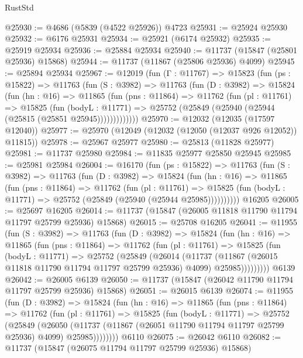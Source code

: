 \begin{lexlean}{RustStd}
\begin{coremodule}
@25930 := @4686 (@5839 (@4522 @25926)) @4723
@25931 := @25924 @25930
@25932 := @6176 @25931
@25934 := @25921 (@6174 @25932)
@25935 := @25919 @25934
@25936 := @25884 @25934
@25940 := @11737 (@15847 (@25801 @25936) @15868)
@25944 := @11737 (@11867 (@25806 @25936) @4099)
@25945 := @25894 @25934
@25967 := @12019
    (fun (Γ : @11767) =>
    @15823
      (fun (ps : @15822) =>
      @11763
        (fun (S : @3982) =>
        @11763
          (fun (D : @3982) =>
          @15824
            (fun (hn : @16) =>
            @11865
              (fun (pns : @11864) =>
              @11762
                (fun (pl : @11761) =>
                @15825
                  (fun (bodyL : @11771) =>
                  @25752 (@25849 (@25940 (@25944 (@25815 (@25851 @25945)))))))))))))
@25970 := @12032 (@12035 (@17597 @12040))
@25977 := @25970 (@12049 (@12032 (@12050 (@12037 @926 @12052)) @11815))
@25978 := @25967 @25977
@25980 := @25813 (@11828 @25977)
@25981 := @11737 @25980
@25984 := @11835 @25977 @25850 @25945
@25985 := @25981 @25984
@26004 := @16170
    (fun (ps : @15822) =>
    @11763
      (fun (S : @3982) =>
      @11763
        (fun (D : @3982) =>
        @15824
          (fun (hn : @16) =>
          @11865
            (fun (pns : @11864) =>
            @11762
              (fun (pl : @11761) =>
              @15825 (fun (bodyL : @11771) => @25752 (@25849 (@25940 (@25944 @25985))))))))))
    @16205
@26005 := @25697 @16205
@26014 := @11737 (@15847 (@26005 @11818 @11790 @11794 @11797 @25799 @25936) @15868)
@26015 := @25708 @16205
@26041 := @11955
    (fun (S : @3982) =>
    @11763
      (fun (D : @3982) =>
      @15824
        (fun (hn : @16) =>
        @11865
          (fun (pns : @11864) =>
          @11762
            (fun (pl : @11761) =>
            @15825
              (fun (bodyL : @11771) =>
              @25752
                (@25849
                  (@26014
                    (@11737
                      (@11867 (@26015 @11818 @11790 @11794 @11797 @25799 @25936) @4099)
                      @25985)))))))))
    @6139
@26042 := @26005 @6139
@26050 := @11737 (@15847 (@26042 @11790 @11794 @11797 @25799 @25936) @15868)
@26051 := @26015 @6139
@26074 := @11955
    (fun (D : @3982) =>
    @15824
      (fun (hn : @16) =>
      @11865
        (fun (pns : @11864) =>
        @11762
          (fun (pl : @11761) =>
          @15825
            (fun (bodyL : @11771) =>
            @25752
              (@25849
                (@26050
                  (@11737 (@11867 (@26051 @11790 @11794 @11797 @25799 @25936) @4099) @25985))))))))
    @6110
@26075 := @26042 @6110
@26082 := @11737 (@15847 (@26075 @11794 @11797 @25799 @25936) @15868)

\end{coremodule}
\end{lexlean}
